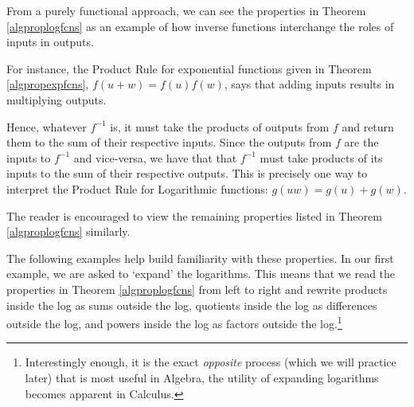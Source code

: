 \smallskip

From a purely functional approach, we can see the properties in Theorem \ref{algproplogfcns} as an example of how inverse functions interchange the roles of inputs in outputs.  

\smallskip

For instance, the Product Rule for exponential functions given in Theorem  \ref{algpropexpfcns}, $f(u+w) = f(u)f(w)$, says that adding inputs results in multiplying outputs.   

\smallskip

Hence, whatever $f^{-1}$ is, it must take the products of outputs from $f$ and return them to the sum of their respective inputs.  Since the outputs from $f$ are the inputs to $f^{-1}$ and vice-versa, we have that that $f^{-1}$ must take products of its inputs to the sum of their respective outputs. This is precisely one way to interpret the Product Rule for Logarithmic functions:  $g(uw) = g(u) + g(w)$.  

\smallskip

The reader is encouraged to view the remaining properties listed in Theorem \ref{algproplogfcns} similarly.  

\smallskip

The following examples help build familiarity with these properties.  In our first example, we are asked to `expand' the logarithms.  This means that we read the properties in Theorem \ref{algproplogfcns} from left to right and rewrite products inside the log as sums outside the log, quotients inside the log as  differences outside the log, and powers inside the log as factors outside the log.\footnote{Interestingly enough, it is the exact \textit{opposite} process (which we will practice later) that is most useful in Algebra, the utility of expanding logarithms becomes apparent in Calculus.}

\smallskip


